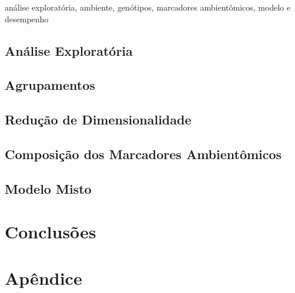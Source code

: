 \documentclass[12pt, a4paper, twoside]{report}
\numberwithin{equation}{subsection} %
\begin{document}
análise exploratória, ambiente, genótipos, marcadores ambientômicos, modelo e desempenho

\section{Análise Exploratória}

\section{Agrupamentos}

\section{Redução de Dimensionalidade}

\section{Composição dos Marcadores Ambientômicos}

\section{Modelo Misto}

\chapter{Conclusões}



\newpage






\chapter*{\textbf{Apêndice}}


\end{document}
